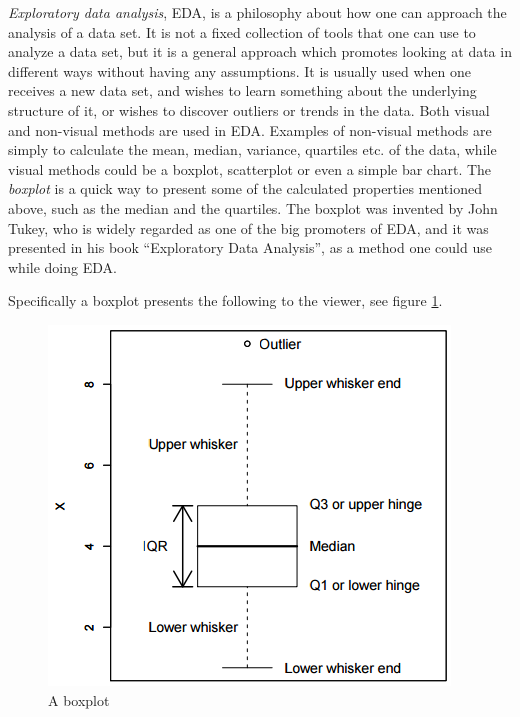 \documentclass[Report.tex]{subfiles}
\begin{document}
\emph{Exploratory data analysis}, EDA, is a philosophy about how one can approach the analysis of a data set.
It is not a fixed collection of tools that one can use to analyze a data set, but it is a general
approach which promotes looking at data in different ways without having any assumptions. It is usually
used when one receives a new data set, and wishes to learn something about the underlying structure of it, or wishes to discover outliers or trends in the data. Both visual and non-visual methods are used
in EDA. Examples of non-visual methods are simply to calculate the mean, median, variance, quartiles etc. of
the data, while visual methods could be a boxplot, scatterplot or even a simple
bar chart. The \emph{boxplot} is a quick way to present some of the calculated properties mentioned above, such as the median and the 
quartiles. The boxplot was invented by John Tukey\cite{Weimer}, who is widely regarded as one of the big promoters of EDA, and
it was presented in his book ``Exploratory Data Analysis'', as a method one could use while doing EDA.

Specifically a boxplot\cite{Seltman} presents the following to the viewer, see figure \ref{fig:boxplot}.

\begin{figure}
\center
\includegraphics[]{"Figures/boxplot"}

\caption{A boxplot\cite{Seltman}}
\label{fig:boxplot}
\end{figure}
\end{document}
